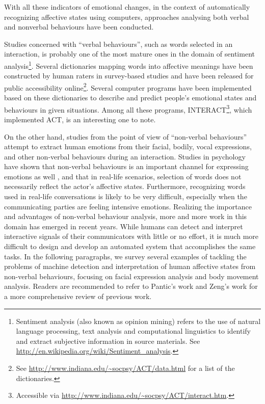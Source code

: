 With all these indicators of emotional changes, in the context of automatically recognizing affective states using computers, approaches analysing both verbal and nonverbal behaviours have been conducted.

Studies concerned with ``verbal behaviours'', such as words selected in an interaction, is probably one of the most mature ones in the domain of sentiment analysis\footnote{Sentiment analysis (also known as opinion mining) refers to the use of natural language processing, text analysis and computational linguistics to identify and extract subjective information in source materials. See \url{http://en.wikipedia.org/wiki/Sentiment_analysis}.}. Several dictionaries mapping words into affective meanings have been constructed by human raters in survey-based studies and have been released for public accessibility online\footnote{See \url{http://www.indiana.edu/~socpsy/ACT/data.html} for a list of the dictionaries.}. Several computer programs have been implemented based on these dictionaries to describe and predict people's emotional states and behaviours in given situations. Among all these programs, INTERACT\footnote{Accessible via \url{http://www.indiana.edu/~socpsy/ACT/interact.htm}.}, which implemented ACT, is an interesting one to note.

On the other hand, studies from the point of view of ``non-verbal behaviours'' attempt to extract human emotions from their facial, bodily, vocal expressions, and other non-verbal behaviours during an interaction. Studies in psychology have shown that non-verbal behaviours is an important channel for expressing emotions as well \cite{schroder2013culture}, and that in real-life scenarios, selection of words does not necessarily reflect the actor's affective states. Furthermore, recognizing words used in real-life conversations is likely to be very difficult, especially when the communicating parties are feeling intensive emotions. Realizing the importance and advantages of non-verbal behaviour analysis, more and more work in this domain has emerged in recent years. While humans can detect and interpret interactive signals of their communicators with little or no effort, it is much more difficult to design and develop an automated system that accomplishes the same tasks. In the following paragraphs, we survey several examples of tackling the problems of machine detection and interpretation of human affective states from non-verbal behaviours, focusing on facial expression analysis and body movement analysis. Readers are recommended to refer to Pantic's work \cite{pantic2003toward} and Zeng's work \cite{zeng2009survey} for a more comprehensive review of previous work.

